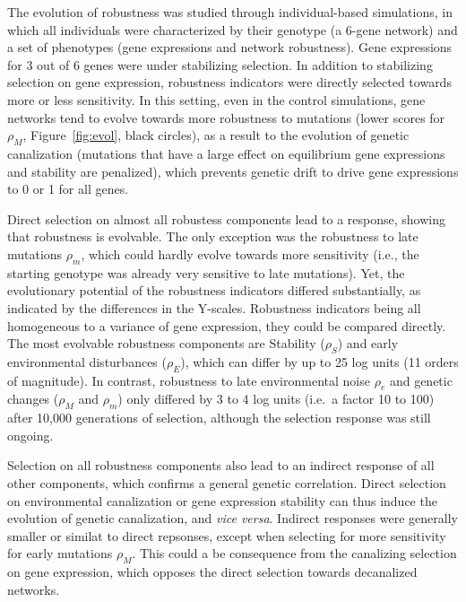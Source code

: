 \documentclass[10pt,a4paper]{article}
\newcommand{\stability}{{\rho_S}}
\newcommand{\earlyenv}{{\rho_E}}
\newcommand{\lateenv}{{\rho_e}}
\newcommand{\earlymut}{{\rho_M}}
\newcommand{\latemut}{{\rho_m}}
\begin{document}
The evolution of robustness was studied through individual-based simulations, in which all individuals were characterized by their genotype (a 6-gene network) and a set of phenotypes (gene expressions and network robustness). Gene expressions for 3 out of 6 genes were under stabilizing selection. In addition to stabilizing selection on gene expression, robustness indicators were directly selected towards more or less sensitivity. In this setting, even in the control simulations, gene networks tend to evolve towards more robustness to mutations (lower scores for $\earlymut$, Figure~\ref{fig:evol}, black circles), as a result to the evolution of genetic canalization (mutations that have a large effect on equilibrium gene expressions and stability are penalized), which prevents genetic drift to drive gene expressions to 0 or 1 for all genes. 

Direct selection on almost all robustess components lead to a response, showing that robustness is evolvable. The only exception was the robustness to late mutations $\latemut$, which could hardly evolve towards more sensitivity (i.e., the starting genotype was already very sensitive to late mutations). Yet, the evolutionary potential of the robustness indicators differed substantially, as indicated by the differences in the Y-scales. Robustness indicators being all homogeneous to a variance of gene expression, they could be compared directly. The most evolvable robustness components are Stability ($\stability$) and early environmental disturbances ($\earlyenv$), which can differ by up to 25 log units (11 orders of magnitude). In contrast, robustness to late environmental noise $\lateenv$ and genetic changes ($\earlymut$ and $\latemut$) only differed by 3 to 4 log units (i.e.\ a factor 10 to 100) after 10,000 generations of selection, although the selection response was still ongoing. 

Selection on all robustness components also lead to an indirect response of all other components, which confirms a general genetic correlation. Direct selection on environmental canalization or gene expression stability can thus induce the evolution of genetic canalization, and \emph{vice versa}. Indirect responses were generally smaller or similat to direct repsonses, except when selecting for more sensitivity for early mutations $\earlymut$. This could a be consequence from the canalizing selection on gene expression, which opposes the direct selection towards decanalized networks. 
\end{document}
